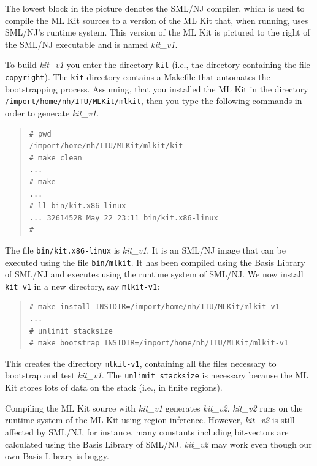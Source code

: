 \documentclass[12pt]{book}
\begin{document}
The lowest block in the picture denotes the SML/NJ compiler, which is
used to compile the ML Kit sources to a version of the ML Kit that,
when running, uses SML/NJ's runtime system. This version of the ML Kit
is pictured to the right of the SML/NJ executable and is named
\emph{kit\_v1}.

To build \emph{kit\_v1} you enter the directory \texttt{kit} (i.e.,
the directory containing the file \texttt{copyright}). The
\texttt{kit} directory contains a Makefile that automates the
bootstrapping process.  Assuming, that you installed the ML Kit in the
directory \texttt{/import/home/nh/ITU/MLKit/mlkit}, then you type the
following commands in order to generate \emph{kit\_v1}.

\begin{small}
\begin{quote}
\begin{verbatim}
# pwd
/import/home/nh/ITU/MLKit/mlkit/kit
# make clean
...
# make
...
# ll bin/kit.x86-linux 
... 32614528 May 22 23:11 bin/kit.x86-linux
# 
\end{verbatim}
\end{quote}
\end{small}

The file \texttt{bin/kit.x86-linux} is \emph{kit\_v1}. It is an SML/NJ
image that can be executed using the file \texttt{bin/mlkit}. It has
been compiled using the Basis Library of SML/NJ and executes using the
runtime system of SML/NJ. We now install \texttt{kit\_v1} in a new
directory, say \texttt{mlkit-v1}:

\begin{small}
\begin{quote}
\begin{verbatim}
# make install INSTDIR=/import/home/nh/ITU/MLKit/mlkit-v1
...
# unlimit stacksize
# make bootstrap INSTDIR=/import/home/nh/ITU/MLKit/mlkit-v1
\end{verbatim}
\end{quote}
\end{small}

This creates the directory \texttt{mlkit-v1}, containing all the files
necessary to bootstrap and test \emph{kit\_v1}. The \texttt{unlimit
  stacksize} is necessary because the ML Kit stores lots of data on
the stack (i.e., in finite regions).

Compiling the ML Kit source with \emph{kit\_v1} generates
\emph{kit\_v2}. \emph{kit\_v2} runs on the runtime system of the ML
Kit using region inference. However, \emph{kit\_v2} is still affected
by SML/NJ, for instance, many constants including bit-vectors are
calculated using the Basis Library of SML/NJ.  \emph{kit\_v2} may work
even though our own Basis Library is buggy.
\end{document}
